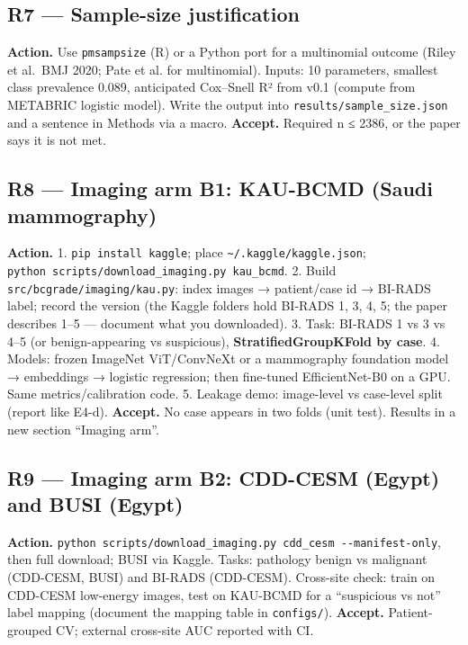 \documentclass[
  10pt,
]{article}
\begin{document}
\hypertarget{r7-sample-size-justification}{%
\subsection{R7 --- Sample-size
justification}\label{r7-sample-size-justification}}

\textbf{Action.} Use \texttt{pmsampsize} (R) or a Python port for a
multinomial outcome (Riley et al.~BMJ 2020; Pate et al. for
multinomial). Inputs: 10 parameters, smallest class prevalence 0.089,
anticipated Cox--Snell R² from v0.1 (compute from METABRIC logistic
model). Write the output into \texttt{results/sample\_size.json} and a
sentence in Methods via a macro. \textbf{Accept.} Required n ≤ 2386, or
the paper says it is not met.

\hypertarget{r8-imaging-arm-b1-kau-bcmd-saudi-mammography}{%
\subsection{R8 --- Imaging arm B1: KAU-BCMD (Saudi
mammography)}\label{r8-imaging-arm-b1-kau-bcmd-saudi-mammography}}

\textbf{Action.} 1. \texttt{pip\ install\ kaggle}; place
\texttt{\textasciitilde{}/.kaggle/kaggle.json};
\texttt{python\ scripts/download\_imaging.py\ kau\_bcmd}. 2. Build
\texttt{src/bcgrade/imaging/kau.py}: index images → patient/case id →
BI-RADS label; record the version (the Kaggle folders hold BI-RADS 1, 3,
4, 5; the paper describes 1--5 --- document what you downloaded). 3.
Task: BI-RADS 1 vs 3 vs 4--5 (or benign-appearing vs suspicious),
\textbf{StratifiedGroupKFold by case}. 4. Models: frozen ImageNet
ViT/ConvNeXt or a mammography foundation model → embeddings → logistic
regression; then fine-tuned EfficientNet-B0 on a GPU. Same
metrics/calibration code. 5. Leakage demo: image-level vs case-level
split (report like E4-d). \textbf{Accept.} No case appears in two folds
(unit test). Results in a new section ``Imaging arm''.

\hypertarget{r9-imaging-arm-b2-cdd-cesm-egypt-and-busi-egypt}{%
\subsection{R9 --- Imaging arm B2: CDD-CESM (Egypt) and BUSI
(Egypt)}\label{r9-imaging-arm-b2-cdd-cesm-egypt-and-busi-egypt}}

\textbf{Action.}
\texttt{python\ scripts/download\_imaging.py\ cdd\_cesm\ -\/-manifest-only},
then full download; BUSI via Kaggle. Tasks: pathology benign vs
malignant (CDD-CESM, BUSI) and BI-RADS (CDD-CESM). Cross-site check:
train on CDD-CESM low-energy images, test on KAU-BCMD for a ``suspicious
vs not'' label mapping (document the mapping table in
\texttt{configs/}). \textbf{Accept.} Patient-grouped CV; external
cross-site AUC reported with CI.
\end{document}
